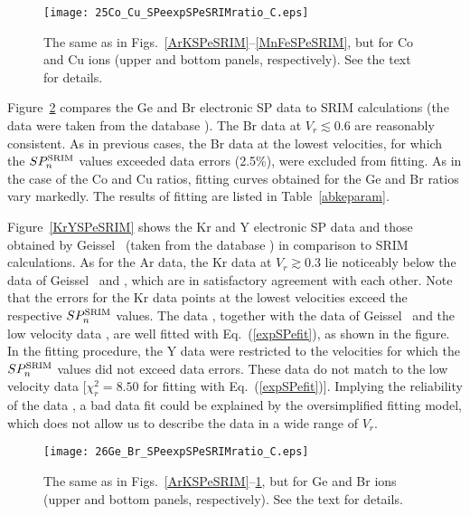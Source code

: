 \documentclass[aps,pra,twocolumn,amsmath,amssymb,floatfix]{revtex4-2}
\begin{document}
\begin{figure}[!h]   %
\begin{center}
\texttt{[image: 25Co\_Cu\_SPeexpSPeSRIMratio\_C.eps]}
\caption{\label{CoCuSPeSRIM} The same as in Figs.~\ref{ArKSPeSRIM}--\ref{MnFeSPeSRIM}, but for Co and Cu ions (upper and bottom panels, respectively). See the text for details.}
\end{center}
\end{figure}

Figure~\ref{GeBrSPeSRIM} compares the Ge and Br electronic SP data \cite{Zhang2002,Hvelp68,BrownMoak72,AnthLanf82} to SRIM calculations (the data \cite{Zhang2002} were taken from the database \cite{IAEASP}). The Br data at $V_{r} \lesssim 0.6$ \cite{Zhang2002,BrownMoak72,AnthLanf82} are reasonably consistent. As in previous cases, the Br data \cite{Zhang2002} at the lowest velocities, for which the $SP_{n}^{\rm SRIM}$ values exceeded data errors (2.5\%), were excluded from fitting. As in the case of the Co and Cu ratios, fitting curves obtained for the Ge and Br ratios vary markedly. The results of fitting are listed in Table~\ref{abkeparam}.

Figure~\ref{KrYSPeSRIM} shows the Kr and Y electronic SP data \cite{Hvelp68,Lennard86,Pape78,Trzaska18,Perkowski09} and those obtained by Geissel \ea\ (taken from the database \cite{IAEASP}) in comparison to SRIM calculations. As for the Ar data, the Kr data \cite{Pape78} at $V_{r}\gtrsim 0.3$ lie noticeably below the data of Geissel \ea\ and \cite{Trzaska18}, which are in satisfactory agreement with each other. Note that the errors for the Kr data points at the lowest velocities \cite{Trzaska18} exceed the respective $SP_{n}^{\rm SRIM}$ values. The data \cite{Trzaska18}, together with the data of Geissel \ea\ and the low velocity data \cite{Hvelp68,Lennard86}, are well fitted with Eq.~(\ref{expSPefit}), as shown in the figure. In the fitting procedure, the Y data \cite{Perkowski09} were restricted to the velocities for which the $SP_{n}^{\rm SRIM}$ values did not exceed data errors. These data do not match to the low velocity data \cite{Hvelp68} [$\chi^{2}_{r} = 8.50$ for fitting with Eq.~(\ref{expSPefit})]. Implying the reliability of the data \cite{Perkowski09}, a bad data fit could be explained by the oversimplified fitting model, which does not allow us to describe the data in a wide range of $V_{r}$.

\begin{figure}[!h]   %
\begin{center}
\texttt{[image: 26Ge\_Br\_SPeexpSPeSRIMratio\_C.eps]}
\caption{\label{GeBrSPeSRIM} The same as in Figs.~\ref{ArKSPeSRIM}--\ref{CoCuSPeSRIM}, but for Ge and Br ions (upper and bottom panels, respectively). See the text for details.}
\end{center}
\end{figure}
\end{document}
